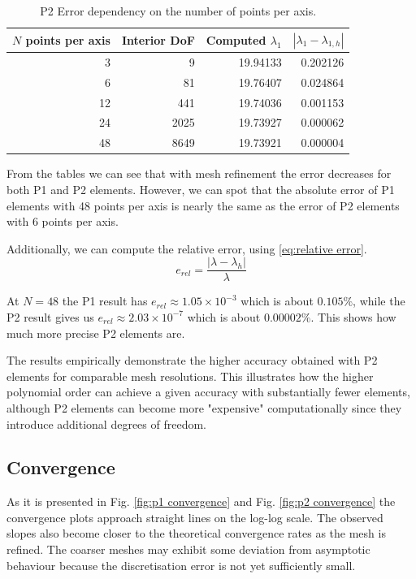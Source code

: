 \documentclass[acmsmall,screen]{MapleTrans}
\begin{document}
\begin{table}[H]
    \centering
    \caption{P2 Error dependency on the number of points per axis.}
    \label{tab:P2 error dependency}
    \begin{tabular}{rrrr}
        \toprule
        $N$ points per axis & Interior DoF & Computed $\lambda_1$ & $|\lambda_1 - \lambda_{1,h}|$ \\
        \midrule
        3 & 9 & 19.94133 & 0.202126 \\
        6 & 81 & 19.76407 & 0.024864 \\
        12 & 441 & 19.74036 & 0.001153 \\
        24 & 2025 & 19.73927 & 0.000062 \\
        48 & 8649 & 19.73921 & 0.000004 \\
        \bottomrule
    \end{tabular}
\end{table}

From the tables we can see that with mesh refinement the error decreases for both P1 and P2 elements. However, we can spot that the absolute error of P1 elements with 48 points per axis is nearly the same as the error of P2 elements with 6 points per axis.

Additionally, we can compute the relative error, using \eqref{eq:relative error}.
\begin{equation}
    e_{rel} = \frac{|\lambda - \lambda_h|}{\lambda}
    \label{eq:relative error}
\end{equation}

At $N = 48$ the P1 result has $e_{rel} \approx 1.05 \times 10^{-3}$ which is about $0.105\%$, while the P2 result gives us $e_{rel} \approx 2.03 \times 10^{-7}$ which is about $0.00002\%$. This shows how much more precise P2 elements are.

The results empirically demonstrate the higher accuracy obtained with P2 elements for comparable mesh resolutions. This illustrates how the higher polynomial order can achieve a given accuracy with substantially fewer elements, although P2 elements can become more "expensive" computationally since they introduce additional degrees of freedom.


\subsection{Convergence}
As it is presented in Fig. \ref{fig:p1 convergence} and Fig. \ref{fig:p2 convergence} the convergence plots approach straight lines on the log-log scale. The observed slopes also become closer to the theoretical convergence rates as the mesh is refined. 
The coarser meshes may exhibit some deviation from asymptotic behaviour because the discretisation error is not yet sufficiently small.
\end{document}
